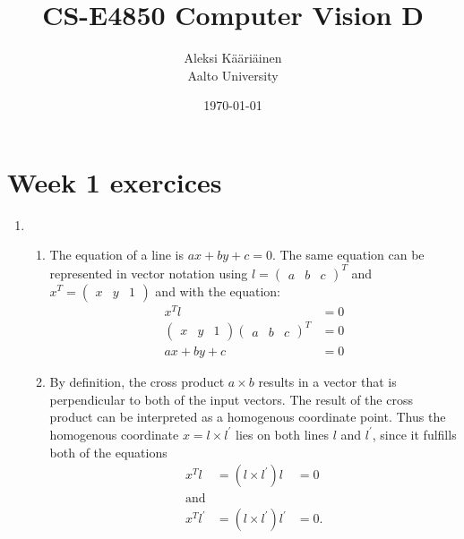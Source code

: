 \documentclass[11pt,a4paper]{article}
\title{CS-E4850 Computer Vision D}
\author{Aleksi Kääriäinen  \\
	Aalto University  \\
	}
\begin{document}
\date{\today}

\maketitle

\newpage

\section*{Week 1 exercices}

\begin{enumerate}
      \item

            \begin{enumerate}

                  \item The equation of a line is $ax + by + c = 0$. The same equation can be represented in vector notation using $l = \begin{pmatrix}
                                    a & b & c
                              \end{pmatrix}^T$ and $x^T = \begin{pmatrix}
                                    x & y & 1
                              \end{pmatrix}$ and with the equation:
                        \begin{align*}
                              x^T l                         & = 0 \\
                              \begin{pmatrix}
                                    x & y & 1
                              \end{pmatrix} \begin{pmatrix}
                                                  a & b & c
                                            \end{pmatrix}^T & = 0 \\
                              ax + by + c                   & = 0
                        \end{align*}

                  \item By definition, the cross product $a \times b$ results in a vector that is perpendicular to
                        both of the input vectors. The result of the cross product can be interpreted as a homogenous coordinate point.
                        Thus the homogenous coordinate $x = l \times l^\prime$ lies on both lines $l$ and $l^\prime$, since it
                        fulfills both of the equations
                        \begin{align*}
                              x^T l          & = (l \times l^\prime)l        & = 0 \\
                              \text{and}                                           \\
                              x^T l^{\prime} & = (l \times l^\prime)l^\prime & = 0.
                        \end{align*}


\end{enumerate}
\end{enumerate}
\end{document}
